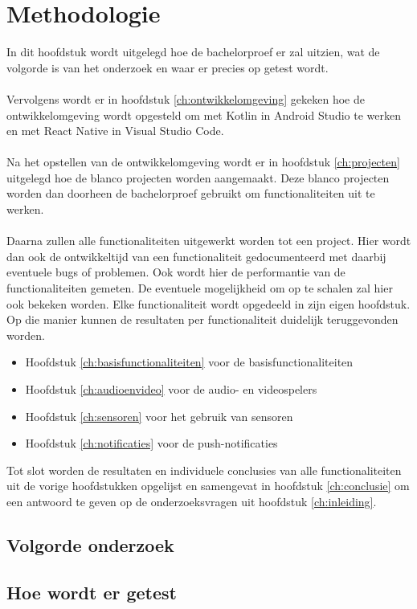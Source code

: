 
\chapter{Methodologie}
\label{ch:methodologie}

In dit hoofdstuk wordt uitgelegd hoe de bachelorproef er zal uitzien, wat 
de volgorde is van het onderzoek en waar er precies op getest wordt.
\\\\
Vervolgens wordt er in hoofdstuk \ref{ch:ontwikkelomgeving} gekeken hoe 
de ontwikkelomgeving wordt opgesteld om met Kotlin in Android Studio 
te werken en met React Native in Visual Studio Code.
\\\\
Na het opstellen van de ontwikkelomgeving wordt er in hoofdstuk 
\ref{ch:projecten} uitgelegd hoe de blanco projecten worden aangemaakt. 
Deze blanco projecten worden dan doorheen de bachelorproef gebruikt om 
functionaliteiten uit te werken.
\\\\
Daarna zullen alle functionaliteiten uitgewerkt worden tot een project. 
Hier wordt dan ook de ontwikkeltijd van een functionaliteit gedocumenteerd 
met daarbij eventuele bugs of problemen. Ook wordt hier de performantie van 
de functionaliteiten gemeten. De eventuele mogelijkheid om op te 
schalen zal hier ook bekeken worden. Elke functionaliteit wordt opgedeeld 
in zijn eigen hoofdstuk. Op die manier kunnen de resultaten per 
functionaliteit duidelijk teruggevonden worden.
\begin{itemize}
    \item Hoofdstuk \ref{ch:basisfunctionaliteiten} voor de basisfunctionaliteiten
    \item Hoofdstuk \ref{ch:audioenvideo} voor de audio- en videospelers
    \item Hoofdstuk \ref{ch:sensoren} voor het gebruik van sensoren
    \item Hoofdstuk \ref{ch:notificaties} voor de push-notificaties
\end{itemize}
Tot slot worden de resultaten en individuele conclusies van alle 
functionaliteiten uit de vorige hoofdstukken opgelijst en samengevat in hoofdstuk 
\ref{ch:conclusie} om een antwoord te geven op de onderzoeksvragen uit 
hoofdstuk \ref{ch:inleiding}.

\section{Volgorde onderzoek}



\section{Hoe wordt er getest}





